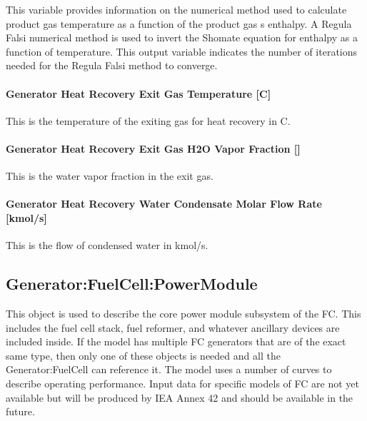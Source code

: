 This variable provides information on the numerical method used to calculate product gas temperature as a function of the product gas s enthalpy. A Regula Falsi numerical method is used to invert the Shomate equation for enthalpy as a function of temperature. This output variable indicates the number of iterations needed for the Regula Falsi method to converge.

\paragraph{Generator Heat Recovery Exit Gas Temperature {[}C{]}}\label{generator-heat-recovery-exit-gas-temperature-c}

This is the temperature of the exiting gas for heat recovery in C.

\paragraph{\texorpdfstring{Generator Heat Recovery Exit Gas H2O Vapor Fraction {[]}}{Generator Heat Recovery Exit Gas H2O Vapor Fraction }}\label{generator-heat-recovery-exit-gas-h2o-vapor-fraction}

This is the water vapor fraction in the exit gas.

\paragraph{Generator Heat Recovery Water Condensate Molar Flow Rate {[}kmol/s{]}}\label{generator-heat-recovery-water-condensate-molar-flow-rate-kmols}

This is the flow of condensed water in kmol/s.

\subsection{Generator:FuelCell:PowerModule}\label{generatorfuelcellpowermodule}

This object is used to describe the core power module subsystem of the FC. This includes the fuel cell stack, fuel reformer, and whatever ancillary devices are included inside. If the model has multiple FC generators that are of the exact same type, then only one of these objects is needed and all the Generator:FuelCell can reference it. The model uses a number of curves to describe operating performance. Input data for specific models of FC are not yet available but will be produced by IEA Annex 42 and should be available in the future.

